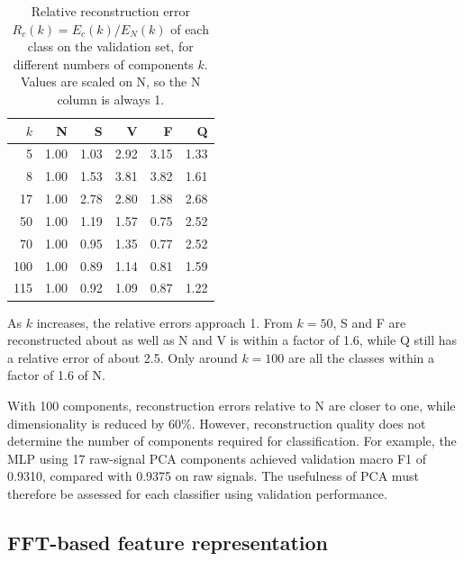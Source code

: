 \documentclass[11pt,oneside,a4paper]{article}
\begin{document}
    \begin{table}[htbp]
        \centering
        \begin{tabular}{rrrrrr}
            \toprule
            $k$ & N & S & V & F & Q \\
            \midrule
            5   & 1.00 & 1.03 & 2.92 & 3.15 & 1.33 \\
            8   & 1.00 & 1.53 & 3.81 & 3.82 & 1.61 \\
            17  & 1.00 & 2.78 & 2.80 & 1.88 & 2.68 \\
            50  & 1.00 & 1.19 & 1.57 & 0.75 & 2.52 \\
            70  & 1.00 & 0.95 & 1.35 & 0.77 & 2.52 \\
            100 & 1.00 & 0.89 & 1.14 & 0.81 & 1.59 \\
            115 & 1.00 & 0.92 & 1.09 & 0.87 & 1.22 \\
            \bottomrule
        \end{tabular}
        \caption{Relative reconstruction error
        $R_c(k) = E_c(k)/E_N(k)$ of each class on the validation
        set, for different numbers of components $k$. Values are
        scaled on N, so the N column is always 1.}
        \label{tab:pca_reconstruction}
    \end{table}

    As $k$ increases, the relative errors approach 1. From
    $k = 50$, S and F are reconstructed about as well as N and
    V is within a factor of 1.6, while Q still has a relative
    error of about 2.5. Only around
    $k = 100$ are all the classes within a factor of 1.6 of N.

    With 100 components, reconstruction errors relative to N are
    closer to one, while dimensionality is reduced by 60\%.
    However, reconstruction quality does not determine the number
    of components required for classification. For example, the
    MLP using 17 raw-signal PCA components achieved validation
    macro F1 of 0.9310, compared with 0.9375 on raw signals.
    The usefulness of PCA must therefore be assessed for each
    classifier using validation performance.

    \subsection{FFT-based feature representation}
\end{document}
